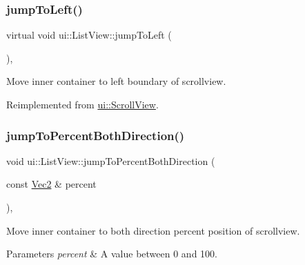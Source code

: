 \mbox{\label{classui_1_1ListView_a141ba140d285c6cc7eba00c9a6dc1efc}} 
\subsubsection{\texorpdfstring{jump\+To\+Left()}{jumpToLeft()}\hspace{0.1cm}{\footnotesize\ttfamily [2/2]}}
{\footnotesize\ttfamily virtual void ui\+::\+List\+View\+::jump\+To\+Left (\begin{DoxyParamCaption}{ }\end{DoxyParamCaption})\hspace{0.3cm}{\ttfamily [override]}, {\ttfamily [virtual]}}

Move inner container to left boundary of scrollview. 

Reimplemented from \hyperlink{classui_1_1ScrollView_a997d4610191286c00079f1b75062f5a5}{ui\+::\+Scroll\+View}.

\mbox{\label{classui_1_1ListView_aeb683b8f4eb94d0f22d78c0652bd331a}} 
\subsubsection{\texorpdfstring{jump\+To\+Percent\+Both\+Direction()}{jumpToPercentBothDirection()}\hspace{0.1cm}{\footnotesize\ttfamily [1/2]}}
{\footnotesize\ttfamily void ui\+::\+List\+View\+::jump\+To\+Percent\+Both\+Direction (\begin{DoxyParamCaption}\item[{const \hyperlink{classVec2}{Vec2} \&}]{percent }\end{DoxyParamCaption})\hspace{0.3cm}{\ttfamily [override]}, {\ttfamily [virtual]}}

Move inner container to both direction percent position of scrollview. 
\begin{DoxyParams}{Parameters}
{\em percent} & A value between 0 and 100. \\
\hline
\end{DoxyParams}


